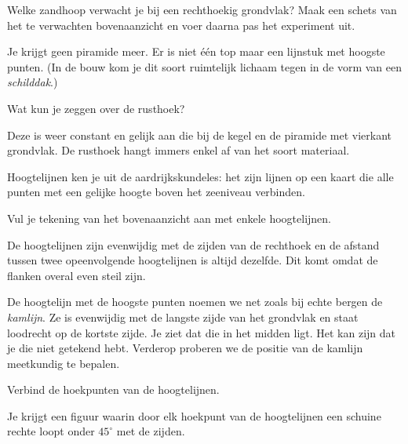 \documentclass{ximera}
\begin{document}
\author{Alexander Holvoet}

\begin{exercise}
    Welke zandhoop verwacht je bij een rechthoekig grondvlak? Maak een schets van het te
    verwachten bovenaanzicht en voer daarna pas het experiment uit.
    \begin{oplossing}
        Je krijgt geen piramide meer. Er is niet \'e\'en top maar een lijnstuk met hoogste
        punten. (In de bouw kom je dit soort ruimtelijk lichaam tegen in de vorm van een
        \textit{schilddak}.)
    \end{oplossing}
\end{exercise}

\begin{exercise}
    Wat kun je zeggen over de rusthoek?
    \begin{oplossing}
        Deze is weer constant en gelijk aan die bij de kegel en de piramide met vierkant
        grondvlak. De rusthoek hangt immers enkel af van het soort materiaal.
    \end{oplossing}
\end{exercise}

Hoogtelijnen ken je uit de aardrijkskundeles: het zijn lijnen op een kaart die alle punten
met een gelijke hoogte boven het zeeniveau verbinden.

\begin{exercise}
    Vul je tekening van het bovenaanzicht aan met enkele hoogtelijnen.
    \begin{oplossing}
        De hoogtelijnen zijn evenwijdig met de zijden van de rechthoek en de afstand tussen
        twee opeenvolgende hoogtelijnen is altijd dezelfde. Dit komt omdat de flanken overal
        even steil zijn.
    \end{oplossing}
\end{exercise}


De hoogtelijn met de hoogste punten noemen we \textemdash{} net zoals bij echte bergen
\textemdash{} de \emph{kamlijn}. Ze is evenwijdig met de langste zijde van het grondvlak
en staat loodrecht op de kortste zijde. Je ziet dat die in het midden ligt. Het kan zijn
dat je die niet getekend hebt. Verderop proberen we de positie van de kamlijn meetkundig
te bepalen.

\begin{exercise}
    Verbind de hoekpunten van de hoogtelijnen.
    \begin{oplossing}
        Je krijgt een figuur waarin door elk hoekpunt van de hoogtelijnen een schuine
        rechte loopt onder \(45^\circ\) met de zijden.
    \end{oplossing}
\end{exercise}
\end{document}
